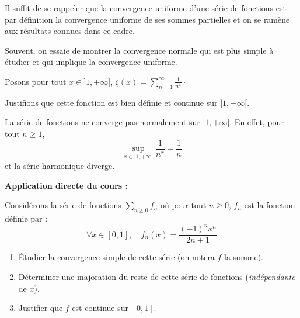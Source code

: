 \documentclass[french,11pt,twoside]{VcCours}
\newenvironment{ApplicationDirecte}{\textbf{Application directe du cours :}

}{}
\begin{document}
\begin{Demonstration}{} 
Il suffit de se rappeler que la convergence uniforme d'une série de fonctions est par définition la convergence uniforme de ses sommes partielles et on se ramène aux résultats connues dans ce cadre.
\end{Demonstration}

\begin{Remarque}{} Souvent, on essaie de montrer la convergence normale qui est plus simple à étudier et qui implique la convergence uniforme.
\end{Remarque}

\begin{Exemple} Posons pour tout $x \in ]1, + \infty[$, $\zeta(x) = \sum_{n=1}^{\infty} \frac{1}{n^x} \cdot$

Justifions que cette fonction est bien définie et continue sur $]1, + \infty[$.

\medskip
%
%
%
%


\newpage

\vspace*{6cm}
\end{Exemple}

\begin{Remarque}{}
La série de fonctions ne converge pas normalement sur $]1, + \infty[$. En effet, pour tout $n \geq 1$,
$$ \sup_{x \in ]1, + \infty[} \frac{1}{n^x} = \frac{1}{n}$$
et la série harmonique diverge.
\end{Remarque}

\begin{ApplicationDirecte} Considérons la série de fonctions $\sum_{n \geq 0} f_n$ où pour tout $n \geq 0$, $f_n$ est la fonction définie par :
$$  \forall x \in [0,1], \quad f_n(x) = \frac{(-1)^n x^n}{2n+1}$$
\begin{enumerate}
\item Étudier la convergence simple de cette série (on notera $f$ la somme).
\item Déterminer une majoration du reste de cette série de fonctions (\emph{indépendante} de $x$).
\item Justifier que $f$ est continue sur $[0,1]$.
\end{enumerate}
\end{ApplicationDirecte}
\end{document}

